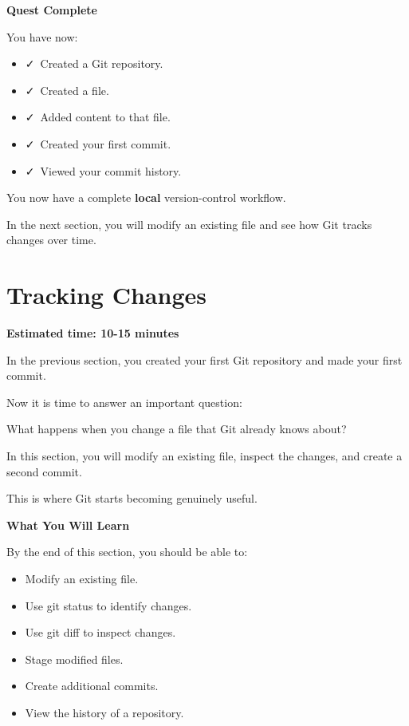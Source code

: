 \documentclass{csc2059practical}
\begin{document}
\begin{wrapupbox}
\textbf{Quest Complete}\par
\medskip
You have now:

\begin{itemize}
  \item \faCheck\ Created a Git repository.
  \item \faCheck\ Created a file.
  \item \faCheck\ Added content to that file.
  \item \faCheck\ Created your first commit.
  \item \faCheck\ Viewed your commit history.
\end{itemize}

You now have a complete \textbf{local} version-control workflow.

In the next section, you will modify an existing file and see how Git tracks changes over time.
\end{wrapupbox}

\section{Tracking Changes}
\begin{infobox}
\textbf{Estimated time: 10-15 minutes}
\end{infobox}
In the previous section, you created your first Git repository and made your first commit.

Now it is time to answer an important question:

What happens when you change a file that Git already knows about?

In this section, you will modify an existing file, inspect the changes, and create a second commit.

This is where Git starts becoming genuinely useful.

\begin{learningoutcomes}
\textbf{What You Will Learn}\par
\medskip
By the end of this section, you should be able to:

\begin{itemize}
  \item Modify an existing file.
  \item Use git status to identify changes.
  \item Use git diff to inspect changes.
  \item Stage modified files.
  \item Create additional commits.
  \item View the history of a repository.
\end{itemize}
\end{learningoutcomes}
\end{document}
